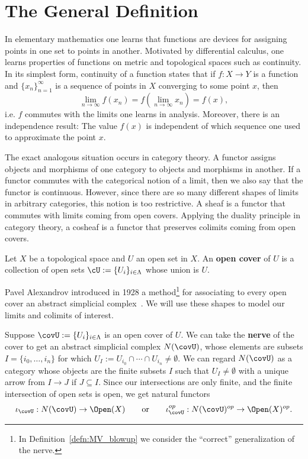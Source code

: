 \section{The General Definition}
\label{subsec:abstract_defn}
In elementary mathematics one learns that functions are devices for assigning points in one set to points in another. Motivated by differential calculus, one learns properties of functions on metric and topological spaces such as continuity. In its simplest form, continuity of a function states that if $f:X\to Y$ is a function and $\{x_n\}_{n=1}^{\infty}$ is a sequence of points in $X$ converging to some point $x$, then
\[
	\lim_{n\to\infty}f(x_n)=f(\lim_{n\to\infty} x_n)=f(x),
\] 
i.e. $f$ commutes with the limits one learns in analysis. Moreover, there is an independence result: The value $f(x)$ is independent of which sequence one used to approximate the point $x$.

The exact analogous situation occurs in category theory. A functor assigns objects and morphisms of one category to objects and morphisms in another. If a functor commutes with the categorical notion of a limit, then we also say that the functor is continuous. However, since there are so many different shapes of limits in arbitrary categories, this notion is too restrictive. A sheaf is a functor that commutes with limits coming from open covers. Applying the duality principle in category theory, a cosheaf is a functor that preserves colimits coming from open covers. 

\begin{defn}
Let $X$ be a topological space and $U$ an open set in $X$. An \textbf{open cover} of $U$ is a collection of open sets $\cU:=\{U_i\}_{i\in\Lambda}$ whose union is $U$.
\end{defn}

Pavel Alexandrov introduced in 1928 a method\footnote{In Definition~\ref{defn:MV_blowup} we consider the ``correct'' generalization of the nerve.} for associating to every open cover an abstract simplicial complex~\cite{nerve}. We will use these shapes to model our limits and colimits of interest. 
\begin{defn}\label{defn:nerve}
	Suppose $\covU:=\{U_i\}_{i\in \Lambda}$ is an open cover of $U$. We can take the \textbf{nerve} of the cover to get an abstract simplicial complex $N(\covU)$, whose elements are subsets $I=\{i_0,\ldots,i_n\}$ for which $U_I:=U_{i_0}\cap\cdots\cap U_{i_n}\neq\emptyset$. We can regard $N(\covU)$ as a category whose objects are the finite subsets $I$ such that $U_I\neq\emptyset$ with a unique arrow from $I\to J$ if $J\subseteq I$. Since our intersections are only finite, and the finite intersection of open sets is open, we get natural functors
	\[
	\iota_{\covU}:N(\covU)\to\Open(X) \qquad \mathrm{or} \qquad \iota^{op}_{\covU}:N(\covU)^{op}\to \Open(X)^{op}.
	\]
\end{defn}

